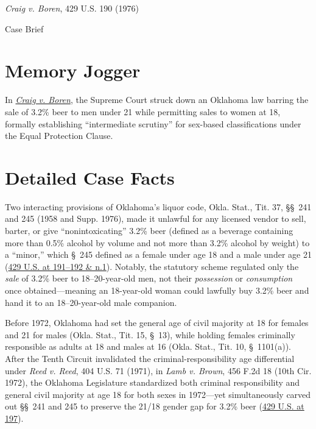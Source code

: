 \documentclass[12pt]{article}
\begin{document}
\begin{center}
{\LARGE \textit{Craig v. Boren}, 429 U.S. 190 (1976)\par}
\vspace{0.8em}
{\large Case Brief\par}
\end{center}
\vspace{1em}

\section{Memory Jogger}

In \href{https://www.courtlistener.com/opinion/109570/craig-v-boren/}{\textit{Craig v. Boren}}, the Supreme Court struck down an Oklahoma law barring the sale of 3.2\% beer to men under 21 while permitting sales to women at 18, formally establishing ``intermediate scrutiny'' for sex-based classifications under the Equal Protection Clause.

\section{Detailed Case Facts}

Two interacting provisions of Oklahoma's liquor code, Okla. Stat., Tit. 37, \S\S\ 241 and 245 (1958 and Supp. 1976), made it unlawful for any licensed vendor to sell, barter, or give ``nonintoxicating'' 3.2\% beer (defined as a beverage containing more than 0.5\% alcohol by volume and not more than 3.2\% alcohol by weight) to a ``minor,'' which \S\ 245 defined as a female under age 18 and a male under age 21 (\href{https://supreme.justia.com/cases/federal/us/429/190/}{429 U.S. at 191--192 \& n.1}). Notably, the statutory scheme regulated only the \textit{sale} of 3.2\% beer to 18--20-year-old men, not their \textit{possession} or \textit{consumption} once obtained---meaning an 18-year-old woman could lawfully buy 3.2\% beer and hand it to an 18--20-year-old male companion.

Before 1972, Oklahoma had set the general age of civil majority at 18 for females and 21 for males (Okla. Stat., Tit. 15, \S\ 13), while holding females criminally responsible as adults at 18 and males at 16 (Okla. Stat., Tit. 10, \S\ 1101(a)). After the Tenth Circuit invalidated the criminal-responsibility age differential under \textit{Reed v. Reed}, 404 U.S. 71 (1971), in \textit{Lamb v. Brown}, 456 F.2d 18 (10th Cir. 1972), the Oklahoma Legislature standardized both criminal responsibility and general civil majority at age 18 for both sexes in 1972---yet simultaneously carved out \S\S\ 241 and 245 to preserve the 21/18 gender gap for 3.2\% beer (\href{https://supreme.justia.com/cases/federal/us/429/190/}{429 U.S. at 197}).
\end{document}
